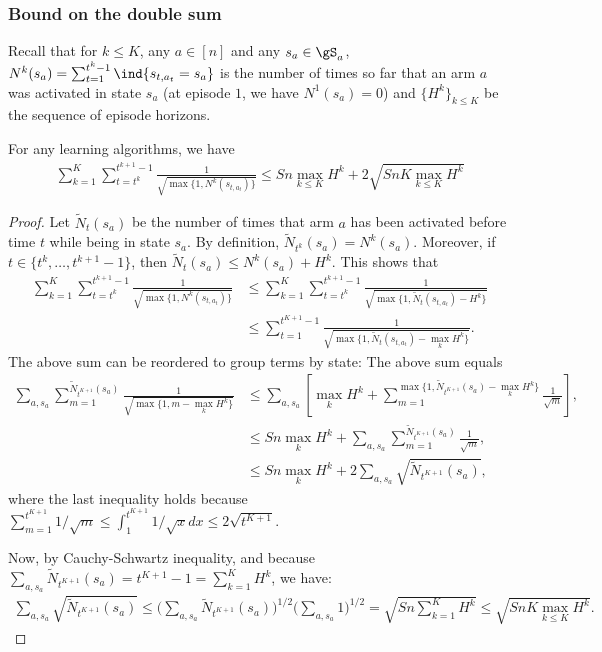 \begin{subappendices}
\subsubsection{Bound on the double sum}

Recall that for $k\le K$, any $a\in[n]$ and any $s_a\in\gS_a$, $N^{k}(s_a)=\sum_{t=1}^{t^{k}-1}\ind{s_{t,a_t}=s_a}$ is the number of times so far that an arm $a$ was activated in state $s_a$ (at episode $1$, we have ${N^1(s_a)=0}$) and $\{H^k\}_{k\le K}$ be the sequence of episode horizons.

\begin{lem}
    For any learning algorithms, we have
    \begin{align*}
        \sum_{k=1}^K \sum_{t=t^k}^{t^{k+1}-1}\frac1{\sqrt{\max\{1,N^{k}(s_{t,a_t})\} }} \le Sn\max_{k\le K}H^k+2\sqrt{SnK\max_{k\le K}H^k}
    \end{align*}
    \label{lem:sum}
\end{lem}
\begin{proof}
Let $\tilde{N}_t(s_a)$ be the number of times that arm $a$ has been activated before time $t$ while being in state $s_a$. By definition, $\tilde{N}_{t^k}(s_a)=N^{k}(s_a)$. Moreover, if $t\in\{t^k,\dots, t^{k+1}-1\}$, then $\tilde{N}_t(s_a)\le N^{k}(s_a) + H^k$. This shows that 
\begin{align*}
    \sum_{k=1}^K \sum_{t=t^k}^{t^{k+1}-1}\frac1{\sqrt{\max\{1,N^{k}(s_{t,a_t})\} }}
    &\le \sum_{k=1}^K \sum_{t=t^k}^{t^{k+1}-1}\frac{1}{\sqrt{\max\{1, \tilde{N}_t(s_{t,a_t})-H^k\} }}\\
    &\le \sum_{t=1}^{t^{K+1}-1} \frac{1}{\sqrt{\max\{1,\tilde{N}_t(s_{t,a_t})-\max_k H^k\} }}.
\end{align*}
The above sum can be reordered to group terms by state: The above sum equals
\begin{align*}        
    \sum_{a, s_a} \sum_{m=1}^{\tilde{N}_{t^{K+1}}(s_a)} \frac{1}{\sqrt{\max\{1, m-\max_k H^k\} }}
    &\le \sum_{a, s_a} \left[\max_k H^k + \sum_{m=1}^{\max\{1,\tilde{N}_{t^{K+1}}(s_a)-\max_k H^k\}} \frac{1}{\sqrt{m}}\right],\\
    &\le Sn\max_k H^k + \sum_{a, s_a} \sum_{m=1}^{\tilde{N}_{t^{K+1}}(s_a)} \frac{1}{\sqrt{m}},\\
    &\le Sn\max_k H^k + 2\sum_{a, s_a} \sqrt{\tilde{N}_{t^{K+1}}(s_a)},
\end{align*}
where the last inequality holds because $\sum_{m=1}^{t^{K+1}}1/\sqrt{m}\le\int_1^{t^{K+1}}1/\sqrt{x}dx\le2\sqrt{{t^{K+1}}}$. 

Now, by Cauchy-Schwartz inequality, and because $\sum_{a,s_a}\tilde{N}_{t^{K{+}1}}(s_a) =t^{K{+}1}-1 {=}\sum_{k=1}^{K}H^k$, we have:
\begin{align*}
    \sum_{a,s_a}\sqrt{\tilde{N}_{t^{K+1}}(s_a)} \le \Big(\sum_{a,s_a}\tilde{N}_{t^{K+1}}(s_a)\Big)^{1/2}\Big(\sum_{a,s_a}1\Big)^{1/2}=\sqrt{Sn\sum_{k=1}^{K}H^k}\le \sqrt{SnK \max_{k\le K}H^k}.
\end{align*}
\end{proof}


\end{subappendices}
